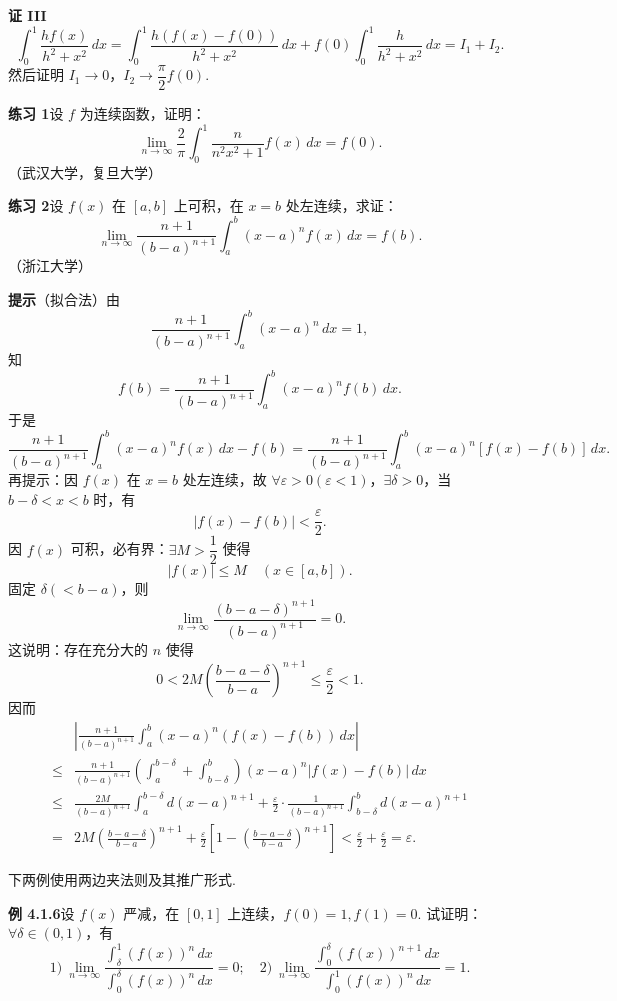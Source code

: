 \documentclass[UTF8, 12pt, fontset=fandol, oneside]{ctexart}
\begin{document}
\noindent\textbf{证 III}\quad
\[
\int_0^1\frac{hf(x)}{h^2+x^2}\,dx
=\int_0^1\frac{h(f(x)-f(0))}{h^2+x^2}\,dx
+f(0)\int_0^1\frac{h}{h^2+x^2}\,dx=I_1+I_2.
\]
然后证明 $I_1\to0$，$I_2\to\dfrac\pi2 f(0)$.

\noindent\textbf{练习 1}\quad 设 $f$ 为连续函数，证明：
\[
\lim_{n\to\infty}\frac2\pi\int_0^1\frac{n}{n^2x^2+1}f(x)\,dx=f(0).
\]
（武汉大学，复旦大学）

\noindent\textbf{练习 2}\quad 设 $f(x)$ 在 $[a,b]$ 上可积，在 $x=b$ 处左连续，求证：
\[
\lim_{n\to\infty}\frac{n+1}{(b-a)^{n+1}}\int_a^b(x-a)^n f(x)\,dx=f(b).
\]
（浙江大学）

\noindent\textbf{提示}\quad （拟合法）由
\[
\frac{n+1}{(b-a)^{n+1}}\int_a^b(x-a)^n\,dx=1,
\]
知
\[
f(b)=\frac{n+1}{(b-a)^{n+1}}\int_a^b(x-a)^n f(b)\,dx.
\]
于是
\[
\frac{n+1}{(b-a)^{n+1}}\int_a^b(x-a)^n f(x)\,dx-f(b)
=\frac{n+1}{(b-a)^{n+1}}\int_a^b(x-a)^n[f(x)-f(b)]\,dx.
\]
再提示：因 $f(x)$ 在 $x=b$ 处左连续，故 $\forall\varepsilon>0(\varepsilon<1)$，$\exists\delta>0$，当 $b-\delta<x<b$ 时，有
\[
|f(x)-f(b)|<\frac\varepsilon2.
\tag{1}
\]
因 $f(x)$ 可积，必有界：$\exists M>\dfrac12$ 使得
\[
|f(x)|\le M\quad(x\in[a,b]).
\tag{2}
\]
固定 $\delta(<b-a)$，则
\[
\lim_{n\to\infty}\frac{(b-a-\delta)^{n+1}}{(b-a)^{n+1}}=0.
\]
这说明：存在充分大的 $n$ 使得
\[
0<2M\left(\frac{b-a-\delta}{b-a}\right)^{n+1}\le\frac\varepsilon2<1.
\tag{3}
\]
因而
\[
\begin{aligned}
&\left|\frac{n+1}{(b-a)^{n+1}}\int_a^b(x-a)^n(f(x)-f(b))\,dx\right|\\
\le{}&\frac{n+1}{(b-a)^{n+1}}
\left(\int_a^{b-\delta}+\int_{b-\delta}^b\right)
(x-a)^n|f(x)-f(b)|\,dx\\
\le{}&\frac{2M}{(b-a)^{n+1}}\int_a^{b-\delta}d(x-a)^{n+1}
+\frac\varepsilon2\cdot\frac1{(b-a)^{n+1}}
\int_{b-\delta}^b d(x-a)^{n+1}\\
={}&2M\left(\frac{b-a-\delta}{b-a}\right)^{n+1}
+\frac\varepsilon2\left[1-\left(\frac{b-a-\delta}{b-a}\right)^{n+1}\right]
<\frac\varepsilon2+\frac\varepsilon2=\varepsilon.
\end{aligned}
\]

下两例使用两边夹法则及其推广形式.

\noindent\textbf{例 4.1.6}\quad 设 $f(x)$ 严减，在 $[0,1]$ 上连续，$f(0)=1,f(1)=0$. 试证明：$\forall\delta\in(0,1)$，有
\[
1)\ \lim_{n\to\infty}\frac{\displaystyle\int_\delta^1(f(x))^n\,dx}
{\displaystyle\int_0^\delta(f(x))^n\,dx}=0;
\quad
2)\ \lim_{n\to\infty}\frac{\displaystyle\int_0^\delta(f(x))^{n+1}\,dx}
{\displaystyle\int_0^1(f(x))^n\,dx}=1.
\]
\end{document}

